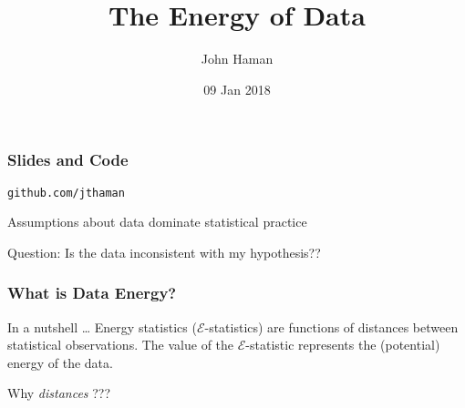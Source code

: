 \documentclass[presentation]{beamer}
\author{John Haman}
\institute{Bowling Green State University, Institute for Defense Analyses}
\date{09 Jan 2018}
\title{The Energy of Data}
\begin{document}
\maketitle

\begin{frame}
  \frametitle{Slides and Code}
  \centering
  \texttt{github.com/jthaman}
\end{frame}

\begin{frame}
  Assumptions about data dominate statistical practice
  \begin{block}{Question:}
    Is the data inconsistent with my hypothesis??
  \end{block}
\end{frame}


\begin{frame}
  \frametitle{What is Data Energy?}
  \begin{centering}
    \begin{block}{In a nutshell \ldots}
      Energy statistics ($\mathcal{E}$-statistics) are functions of distances between statistical
      observations. The value of the $\mathcal{E}$-statistic represents the (potential)
      energy of the data.
    \end{block}
  \end{centering}
  \pause
  \begin{center}
    Why \textit{distances} ??? 
  \end{center}
\end{frame}
\end{document}
